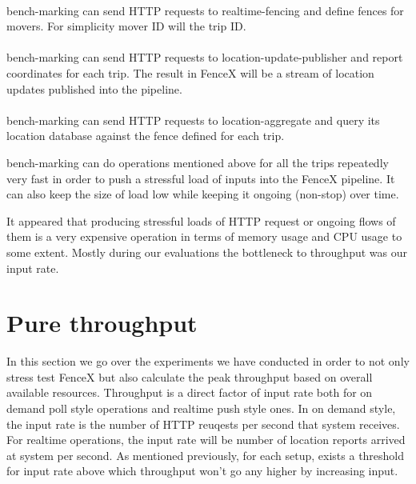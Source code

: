 \documentclass[a4]{report}
\begin{document}
    \paragraph{}
    bench-marking can send HTTP requests to realtime-fencing and define fences for movers.
    For simplicity mover ID will the trip ID.

    \paragraph{}
    bench-marking can send HTTP requests to location-update-publisher and report coordinates for each trip.
    The result in FenceX will be a stream of location updates published into the pipeline.

    \paragraph{}
    bench-marking can send HTTP requests to location-aggregate and query its location database against the fence
    defined for each trip.

    bench-marking can do operations mentioned above for all the trips repeatedly very fast in order to push a
    stressful load of inputs into the FenceX pipeline.
    It can also keep the size of load low while keeping it ongoing (non-stop) over time.

    It appeared that producing stressful loads of HTTP request or ongoing flows of them is a very expensive operation
    in terms of memory usage and CPU usage to some extent.
    Mostly during our evaluations the bottleneck to throughput was our input rate.

    \section{Pure throughput}
    In this section we go over the experiments we have conducted in order to not only stress test FenceX but also
    calculate the peak throughput based on overall available resources.
    Throughput is a direct factor of input rate both for on demand poll style operations and realtime push style ones.
    In on demand style, the input rate is the number of HTTP reuqests per second that system receives.
    For realtime operations, the input rate will be number of location reports arrived at system per second.
    As mentioned previously, for each setup, exists a threshold for input rate above which throughput won't go any
    higher by increasing input.
\end{document}
